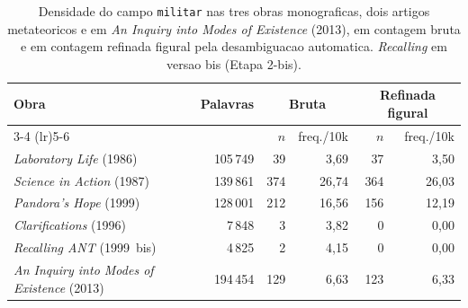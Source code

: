 \begin{table}[htbp]
\centering
\caption[Campo militar refinado, 6 obras de Latour]{Densidade do campo \texttt{militar} nas tres obras monograficas, dois artigos metateoricos e em \emph{An Inquiry into Modes of Existence} (2013), em contagem bruta e em contagem refinada figural pela desambiguacao automatica. \emph{Recalling} em versao bis (Etapa 2-bis).}
\label{tab:militar-refinado-6-obras}
\small
\begin{tabular}{lrrrrr}
\toprule
Obra & Palavras & \multicolumn{2}{c}{Bruta} & \multicolumn{2}{c}{Refinada figural} \\
\cmidrule(lr){3-4} \cmidrule(lr){5-6}
 & & $n$ & freq./10k & $n$ & freq./10k \\
\midrule
\emph{Laboratory Life} (1986) & 105\,749 & 39 & 3{,}69 & 37 & 3{,}50 \\
\emph{Science in Action} (1987) & 139\,861 & 374 & 26{,}74 & 364 & 26{,}03 \\
\emph{Pandora's Hope} (1999) & 128\,001 & 212 & 16{,}56 & 156 & 12{,}19 \\
\midrule
\emph{Clarifications} (1996) & 7\,848 & 3 & 3{,}82 & 0 & 0{,}00 \\
\emph{Recalling ANT} (1999\, bis) & 4\,825 & 2 & 4{,}15 & 0 & 0{,}00 \\
\midrule
\emph{An Inquiry into Modes of Existence} (2013) & 194\,454 & 129 & 6{,}63 & 123 & 6{,}33 \\
\bottomrule
\end{tabular}
\end{table}
